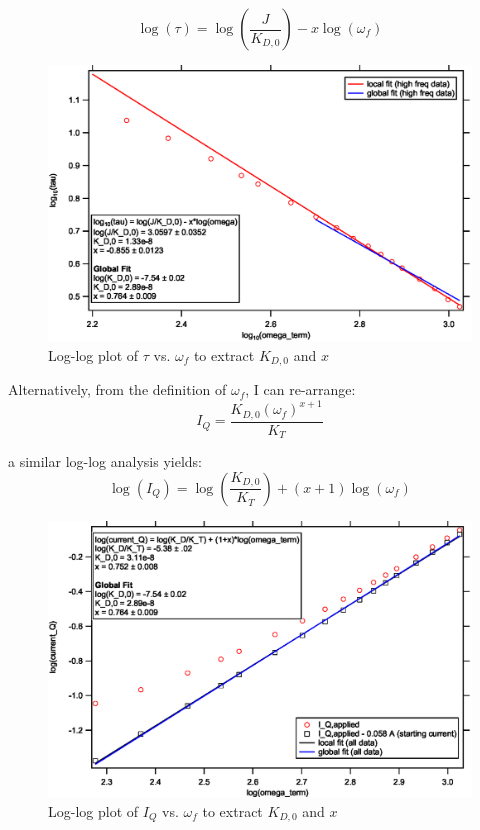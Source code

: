\documentclass[11pt]{article} %
\begin{document}
\begin{equation}
\log(\tau) = \log\left(\frac{J}{K_{D,0}}\right) - x \log(\omega_f)
\end{equation}

\begin{figure}
\centering
\includegraphics[scale=0.75]{LogTauVsLogOmega.eps}
\caption{Log-log plot of $\tau$ vs. $\omega_f$ to extract $K_{D,0}$ and $x$}
\label{fig:LogTauVsLogOmega}
\end{figure}

Alternatively, from the definition of $\omega_f$, I can re-arrange:
\begin{equation}
I_Q = \frac{K_{D,0} (\omega_f)^{x+1}}{K_T}
\label{eq:IQ}
\end{equation}

\noindent a similar log-log analysis yields:
\begin{equation}
\log(I_Q) = \log\left(\frac{K_{D,0}}{K_T}\right) + (x +1) \log(\omega_f)
\end{equation}

\begin{figure}
\centering
\includegraphics[scale=0.75]{LogCurrentVsLogOmega.eps}
\caption{Log-log plot of $I_Q$ vs. $\omega_f$ to extract $K_{D,0}$ and $x$}
\label{fig:LogCurrentVsLogOmega}
\end{figure}
\end{document}
